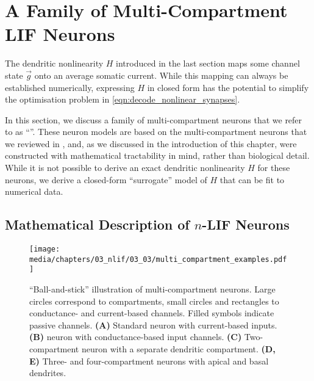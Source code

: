 
\section{A Family of Multi-Compartment LIF Neurons}
\label{sec:nlif}

The dendritic nonlinearity $H$ introduced in the last section maps some channel state $\vec g$ onto an average somatic current.
While this mapping can always be established numerically, expressing $H$ in closed form has the potential to simplify the optimisation problem in \cref{eqn:decode_nonlinear_synapses}.

In this section, we discuss a family of multi-compartment \LIF neurons that we refer to as \enquote{\nlif}.
These neuron models are based on the multi-compartment neurons that we reviewed in , and, as we discussed in the introduction of this chapter, were constructed with mathematical tractability in mind, rather than biological detail.
While it is not possible to derive an exact dendritic nonlinearity $H$ for these neurons, we derive a closed-form \enquote{surrogate} model of $H$ that can be fit to numerical data.

\subsection{Mathematical Description of $n$-LIF Neurons}
\label{sec:nlif_description}

\begin{figure}
	\texttt{[image: media/chapters/03\_nlif/03\_03/multi\_compartment\_examples.pdf]}%
	{\label{fig:nlif_a}}%
	{\label{fig:nlif_b}}%
	{\label{fig:nlif_c}}%
	{\label{fig:nlif_d}}%
	{\label{fig:nlif_e}}%
	\caption[\enquote{Ball-and-stick} illustration of multi-compartment LIF neurons]{\enquote{Ball-and-stick} illustration of multi-compartment \LIF neurons.
	Large circles correspond to compartments, small circles and rectangles to conductance- and current-based channels. Filled symbols indicate passive channels.
	\textbf{(A)} Standard \LIF neuron with current-based inputs.
	\textbf{(B)} \LIF neuron with conductance-based input channels.
	\textbf{(C)} Two-compartment neuron with a separate dendritic compartment.
	\textbf{(D, E)} Three- and four-compartment \LIF neurons with apical and basal dendrites.}
	\label{fig:nlif}
\end{figure}


